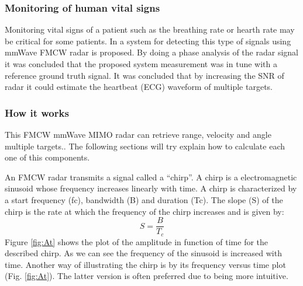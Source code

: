 \subsubsection*{Monitoring of human vital signs}  
Monitoring vital signs of a patient such as the breathing rate or hearth rate may be critical for some patients.
In \cite{alizadeh2019remote} a system for detecting this type of signals using \ac{mmWave} \ac{FMCW} \ac{radar} is proposed. By doing a phase analysis of the \ac{radar} signal it was concluded that the proposed system measurement was in tune with a reference ground truth signal. It was concluded that by increasing the \ac{SNR} of \ac{radar} it could estimate the heartbeat (\ac{ECG}) waveform of multiple targets.

\subsubsection{How it works}
This \ac{FMCW} \ac{mmWave} \ac{MIMO} radar can retrieve range, velocity and angle multiple targets.. The following sections will try explain how to calculate each one of this components.


An \ac{FMCW} radar transmits a signal called a “chirp”. A chirp is a electromagnetic sinusoid whose frequency  increases linearly with time. A chirp is characterized by a start frequency (fc), bandwidth (B) and duration (Tc). The slope (S) of the chirp is the rate at which the frequency of the chirp increases and is given by:
\begin{equation}
    S=\frac{B}{T_c}
\end{equation}
Figure \ref{fig:At} shows the plot of the amplitude in function of time for the described chirp. As we can see the frequency of the sinusoid is increased with time. Another way of illustrating the chirp is by its frequency versus time plot (Fig. \ref{fig:At}). The latter version is often preferred due to being more intuitive.

